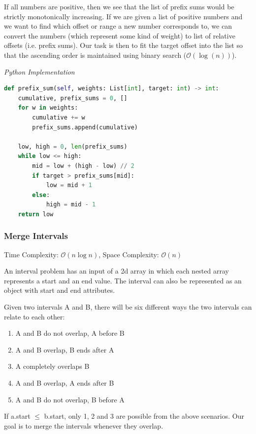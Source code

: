 \documentclass{article}
\newcommand{\bigO}{\mathcal{O}}
\begin{document}
    If all numbers are positive, then we see that the list of prefix sums would be strictly monotonically increasing. If we are given a list of positive numbers and we want to find which offset or range a new number corresponds to, we can convert the numbers (which represent some kind of weight) to list of relative offsets (i.e. prefix sums). Our task is then to fit the target offset into the list so that the ascending order is maintained using binary search ($\bigO(\log(n))$).

\vspace{8pt} \emph{Python Implementation}
\begin{lstlisting}[language=Python]
def prefix_sum(self, weights: List[int], target: int) -> int:
    cumulative, prefix_sums = 0, []
    for w in weights:
        cumulative += w
        prefix_sums.append(cumulative)
        
    low, high = 0, len(prefix_sums)
    while low <= high:
        mid = low + (high - low) // 2
        if target > prefix_sums[mid]:
            low = mid + 1
        else:
            high = mid - 1
    return low
\end{lstlisting}

    \subsubsection{Merge Intervals}
    Time Complexity: $\bigO(n \log n)$, Space Complexity: $\bigO(n)$
    
    An interval problem has an input of a 2d array in which each nested array represents a start and an end value. The interval can also be represented as an object with start and end attributes.
    
    Given two intervals A and B, there will be six different ways the two intervals can relate to each other:
    \begin{enumerate}
        \item A and B do not overlap, A before B
        \item A and B overlap, B ends after A
        \item A completely overlaps B
        \item A and B overlap, A ends after B
        \item  A and B do not overlap, B before A
    \end{enumerate}
    If a.start $\leq$ b.start, only 1, 2 and 3 are possible from the above scenarios.  Our goal is to merge the intervals whenever they overlap.
    
\end{document}
